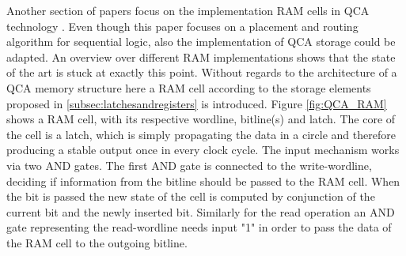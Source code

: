 Another section of papers focus on the implementation RAM cells in QCA technology \cite{crosstalk, RAM_cell}. Even though this paper focuses on a placement and routing algorithm for sequential logic, also the implementation of QCA storage could be adapted. An overview \cite{RAM_overview} over different RAM implementations shows that the state of the art is stuck at exactly this point. Without regards to the architecture of a QCA memory structure here a RAM cell according to the storage elements proposed in \ref{subsec:latchesandregisters} is introduced. Figure \ref{fig:QCA_RAM} shows a RAM cell, with its respective wordline, bitline(s) and latch. The core of the cell is a latch, which is simply propagating the data in a circle and therefore producing a stable output once in every clock cycle. The input mechanism works via two AND gates. The first AND gate is connected to the write-wordline, deciding if information from the bitline should be passed to the RAM cell. When the bit is passed the new state of the cell is computed by conjunction of the current bit and the newly inserted bit. Similarly for the read operation an AND gate representing the read-wordline needs input "1" in order to pass the data of the RAM cell to the outgoing bitline.

